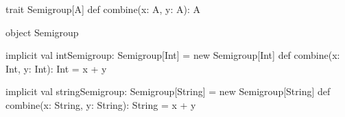 trait Semigroup[A] {
  def combine(x: A, y: A): A
}

object Semigroup {
  implicit val intSemigroup: Semigroup[Int] = new Semigroup[Int] {
    def combine(x: Int, y: Int): Int = x + y
  }

  implicit val stringSemigroup: Semigroup[String] = new Semigroup[String] {
    def combine(x: String, y: String): String = x + y
  }
}